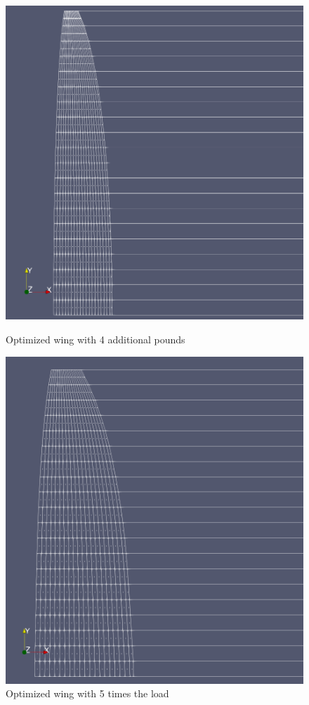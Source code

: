 \documentclass{article}
\begin{document}
\begin{figure}[h]
    \centering
\begin{minipage}[b]{0.45\textwidth}
\centering
\includegraphics[width=\textwidth]{4 pounds more.png}
\caption{Optimized wing with 4 additional pounds}
\label{fig:Slightly Higher}
\end{minipage}
\begin{minipage}[b]{0.45\textwidth}
\centering
\includegraphics[width=\textwidth]{5 Times load.png}
\caption{Optimized wing with 5 times the load}
\label{fig:5 Higher}
\end{minipage}
\end{figure}
\end{document}
